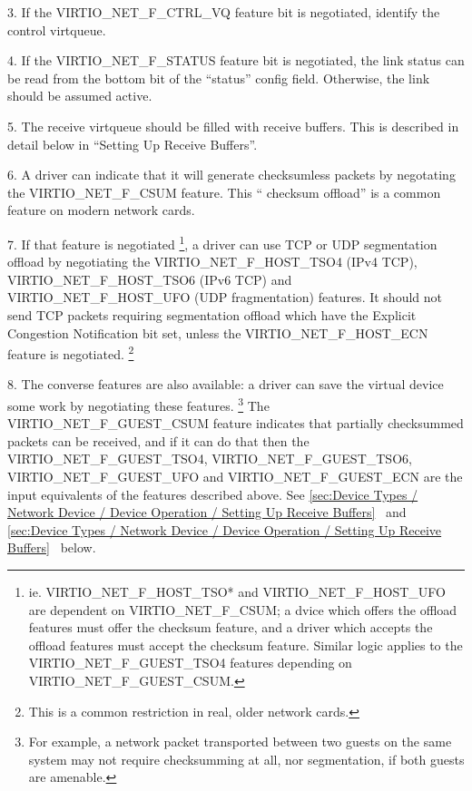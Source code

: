 3. If the VIRTIO_NET_F_CTRL_VQ feature bit is negotiated,
  identify the control virtqueue.

4. If the VIRTIO_NET_F_STATUS feature bit is negotiated, the link
  status can be read from the bottom bit of the “status” config
  field. Otherwise, the link should be assumed active.

5. The receive virtqueue should be filled with receive buffers.
  This is described in detail below in “Setting Up Receive
  Buffers”.

6. A driver can indicate that it will generate checksumless
  packets by negotating the VIRTIO_NET_F_CSUM feature. This “
  checksum offload” is a common feature on modern network cards.

7. If that feature is negotiated
\footnote{ie. VIRTIO_NET_F_HOST_TSO* and VIRTIO_NET_F_HOST_UFO are
dependent on VIRTIO_NET_F_CSUM; a dvice which offers the offload
features must offer the checksum feature, and a driver which
accepts the offload features must accept the checksum feature.
Similar logic applies to the VIRTIO_NET_F_GUEST_TSO4 features
depending on VIRTIO_NET_F_GUEST_CSUM.
}, a driver can use TCP or UDP
  segmentation offload by negotiating the VIRTIO_NET_F_HOST_TSO4 (IPv4
  TCP), VIRTIO_NET_F_HOST_TSO6 (IPv6 TCP) and VIRTIO_NET_F_HOST_UFO
  (UDP fragmentation) features. It should not send TCP packets
  requiring segmentation offload which have the Explicit Congestion
  Notification bit set, unless the VIRTIO_NET_F_HOST_ECN feature is
  negotiated.
\footnote{This is a common restriction in real, older network cards.
}

8. The converse features are also available: a driver can save
  the virtual device some work by negotiating these features.
\footnote{For example, a network packet transported between two guests on
the same system may not require checksumming at all, nor segmentation,
if both guests are amenable.
}
   The VIRTIO_NET_F_GUEST_CSUM feature indicates that partially
  checksummed packets can be received, and if it can do that then
  the VIRTIO_NET_F_GUEST_TSO4, VIRTIO_NET_F_GUEST_TSO6,
  VIRTIO_NET_F_GUEST_UFO and VIRTIO_NET_F_GUEST_ECN are the input
  equivalents of the features described above.
  See \ref{sec:Device Types / Network Device / Device Operation / Setting Up Receive Buffers}~ and \ref{sec:Device Types / Network Device / Device Operation / Setting Up Receive Buffers}~ below.

